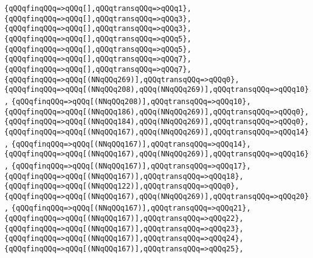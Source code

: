 \verb|{qQQqfinqQQq=>qQQq[],qQQqtransqQQq=>qQQq1},|\newline
\verb|{qQQqfinqQQq=>qQQq[],qQQqtransqQQq=>qQQq3},|\newline
\verb|{qQQqfinqQQq=>qQQq[],qQQqtransqQQq=>qQQq3},|\newline
\verb|{qQQqfinqQQq=>qQQq[],qQQqtransqQQq=>qQQq5},|\newline
\verb|{qQQqfinqQQq=>qQQq[],qQQqtransqQQq=>qQQq5},|\newline
\verb|{qQQqfinqQQq=>qQQq[],qQQqtransqQQq=>qQQq7},|\newline
\verb|{qQQqfinqQQq=>qQQq[],qQQqtransqQQq=>qQQq7},|\newline
\verb|{qQQqfinqQQq=>qQQq[(NNqQQq269)],qQQqtransqQQq=>qQQq0},|\newline
\verb|{qQQqfinqQQq=>qQQq[(NNqQQq208),qQQq(NNqQQq269)],qQQqtransqQQq=>qQQq10},|\newline
\verb|{qQQqfinqQQq=>qQQq[(NNqQQq208)],qQQqtransqQQq=>qQQq10},|\newline
\verb|{qQQqfinqQQq=>qQQq[(NNqQQq186),qQQq(NNqQQq269)],qQQqtransqQQq=>qQQq0},|\newline
\verb|{qQQqfinqQQq=>qQQq[(NNqQQq184),qQQq(NNqQQq269)],qQQqtransqQQq=>qQQq0},|\newline
\verb|{qQQqfinqQQq=>qQQq[(NNqQQq167),qQQq(NNqQQq269)],qQQqtransqQQq=>qQQq14},|\newline
\verb|{qQQqfinqQQq=>qQQq[(NNqQQq167)],qQQqtransqQQq=>qQQq14},|\newline
\verb|{qQQqfinqQQq=>qQQq[(NNqQQq167),qQQq(NNqQQq269)],qQQqtransqQQq=>qQQq16},|\newline
\verb|{qQQqfinqQQq=>qQQq[(NNqQQq167)],qQQqtransqQQq=>qQQq17},|\newline
\verb|{qQQqfinqQQq=>qQQq[(NNqQQq167)],qQQqtransqQQq=>qQQq18},|\newline
\verb|{qQQqfinqQQq=>qQQq[(NNqQQq122)],qQQqtransqQQq=>qQQq0},|\newline
\verb|{qQQqfinqQQq=>qQQq[(NNqQQq167),qQQq(NNqQQq269)],qQQqtransqQQq=>qQQq20},|\newline
\verb|{qQQqfinqQQq=>qQQq[(NNqQQq167)],qQQqtransqQQq=>qQQq21},|\newline
\verb|{qQQqfinqQQq=>qQQq[(NNqQQq167)],qQQqtransqQQq=>qQQq22},|\newline
\verb|{qQQqfinqQQq=>qQQq[(NNqQQq167)],qQQqtransqQQq=>qQQq23},|\newline
\verb|{qQQqfinqQQq=>qQQq[(NNqQQq167)],qQQqtransqQQq=>qQQq24},|\newline
\verb|{qQQqfinqQQq=>qQQq[(NNqQQq167)],qQQqtransqQQq=>qQQq25},|\newline
